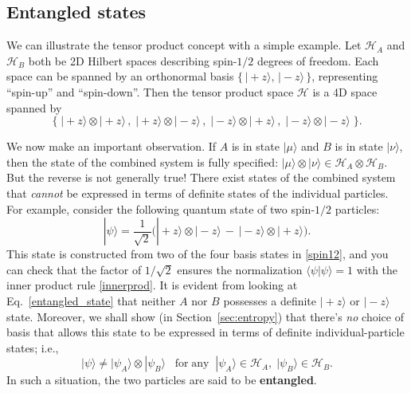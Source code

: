 \documentclass[pra,12pt]{revtex4}
\begin{document}

\subsection{Entangled states}

We can illustrate the tensor product concept with a simple example.
Let $\mathscr{H}_A$ and $\mathscr{H}_B$ both be 2D Hilbert spaces
describing spin-$1/2$ degrees of freedom.  Each space can be spanned
by an orthonormal basis $\{\,|\!+\!z\rangle, \,|\!-\!z\rangle \, \}$,
representing ``spin-up'' and ``spin-down''.  Then the tensor product
space $\mathscr{H}$ is a 4D space spanned by
\begin{equation}
  \Big\{\;|\!+\!z\rangle\otimes|\!+\!z\rangle\,,\; |\!+\!z\rangle\otimes|\!-\!z\rangle\,,\; |\!-z\!\rangle\otimes|\!+\!z\rangle\,,\; |\!-\!z\rangle\otimes|\!-\!z\rangle \;\Big\}.
  \label{spin12}
\end{equation}

We now make an important observation.  If $A$ is in state
$|\mu\rangle$ and $B$ is in state $|\nu\rangle$, then the state of the
combined system is fully specified: $|\mu\rangle \otimes |\nu\rangle
\in \mathscr{H}_A \otimes \mathscr{H}_B$.  But the reverse is not
generally true!  There exist states of the combined system that
\textit{cannot} be expressed in terms of definite states of the
individual particles.  For example, consider the following quantum
state of two spin-$1/2$ particles:
\begin{equation}
  |\psi\rangle = \frac{1}{\sqrt{2}} \Big(|\!+\!z\rangle\otimes|\!-\!z\rangle \,-\, |\!-\!z\rangle\otimes|\!+\!z\rangle\Big).
  \label{entangled_state}
\end{equation}
This state is constructed from two of the four basis states in
\eqref{spin12}, and you can check that the factor of $1/\sqrt{2}$
ensures the normalization $\langle\psi|\psi\rangle = 1$ with the inner
product rule \eqref{innerprod}.  It is evident from looking at
Eq.~\eqref{entangled_state} that neither $A$ nor $B$ possesses a
definite $|\!+\!z\rangle$ or $|\!-\!z\rangle$ state.  Moreover, we
shall show (in Section~\ref{sec:entropy}) that there's \textit{no}
choice of basis that allows this state to be expressed in terms of
definite individual-particle states; i.e.,
\begin{equation}
  |\psi\rangle \ne |\psi_A\rangle\otimes|\psi_B\rangle \;\;\;\textrm{for}\;\textrm{any}\;\; |\psi_A\rangle \in \mathscr{H}_A, \;|\psi_B\rangle \in \mathscr{H}_B.
\end{equation}
In such a situation, the two particles are said to be
\textbf{entangled}.
\end{document}
